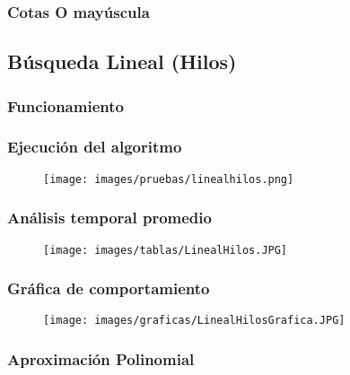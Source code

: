 \documentclass[12pt]{article}
\begin{document}
    		\subsubsection{Cotas O mayúscula}
	
\newpage


		\subsection{Búsqueda Lineal (Hilos)}
			
			\subsubsection{Funcionamiento}
			
			\subsubsection{Ejecución del algoritmo}
				\begin{figure}[H]
			    	   \centering
			    	   \texttt{[image: images/pruebas/linealhilos.png]}
			    \end{figure}
			
			\subsubsection{Análisis temporal promedio}
				\begin{figure}[H]
				    \centering
			    	   \texttt{[image: images/tablas/LinealHilos.JPG]}
			    \end{figure}
			
			\subsubsection{Gráfica de comportamiento}
				\begin{figure}[H]
				    \centering
			    	   \texttt{[image: images/graficas/LinealHilosGrafica.JPG]}
			    \end{figure}
			
			\subsubsection{Aproximación Polinomial}
			
\end{document}
